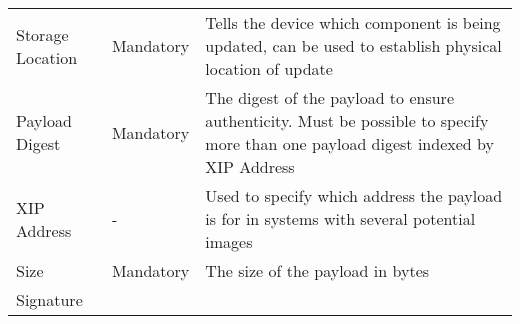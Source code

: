 \documentclass[0-thesis.tex]{subfiles}
\begin{document}
\begin{longtable}[]{@{}lll@{}}
\begin{minipage}[t]{0.23\columnwidth}
    Storage Location\strut
    \end{minipage} & \begin{minipage}[t]{0.26\columnwidth}\raggedright\strut
    Mandatory\strut
    \end{minipage} & \begin{minipage}[t]{0.60\columnwidth}\raggedright\strut
    Tells the device which component is being updated, can be used to
    establish physical location of update\strut
    \end{minipage}\tabularnewline
    \begin{minipage}[t]{0.23\columnwidth}\raggedright\strut
    Payload Digest\strut
    \end{minipage} & \begin{minipage}[t]{0.26\columnwidth}\raggedright\strut
    Mandatory\strut
    \end{minipage} & \begin{minipage}[t]{0.60\columnwidth}\raggedright\strut
    The digest of the payload to ensure authenticity. Must be possible to
    specify more than one payload digest indexed by XIP Address\strut
    \end{minipage}\tabularnewline
    \begin{minipage}[t]{0.23\columnwidth}\raggedright\strut
    XIP Address\strut
    \end{minipage} & \begin{minipage}[t]{0.26\columnwidth}\raggedright\strut
    -\strut
    \end{minipage} & \begin{minipage}[t]{0.60\columnwidth}\raggedright\strut
    Used to specify which address the payload is for in systems with several
    potential images\strut
    \end{minipage}\tabularnewline
    \begin{minipage}[t]{0.23\columnwidth}\raggedright\strut
    Size\strut
    \end{minipage} & \begin{minipage}[t]{0.26\columnwidth}\raggedright\strut
    Mandatory\strut
    \end{minipage} & \begin{minipage}[t]{0.60\columnwidth}\raggedright\strut
    The size of the payload in bytes\strut
    \end{minipage}\tabularnewline
    \begin{minipage}[t]{0.23\columnwidth}\raggedright\strut
    Signature\strut
    \end{minipage} & \begin{minipage}[t]{0.26\columnwidth}\raggedright\strut

\end{minipage}
\end{longtable}
\end{document}
